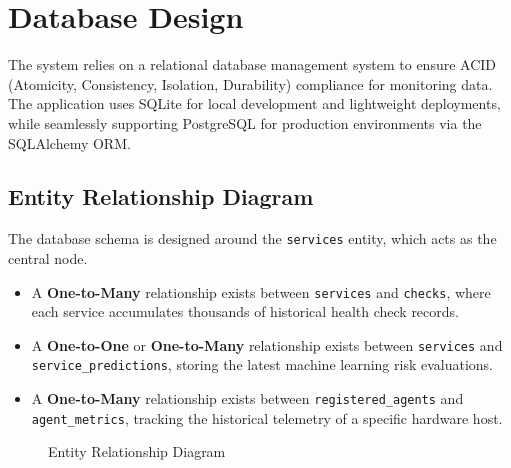 \documentclass[12pt,a4paper,oneside]{report}
\begin{document}
\section{Database Design}
\noindent The system relies on a relational database management system to ensure ACID (Atomicity, Consistency, Isolation, Durability) compliance for monitoring data. The application uses SQLite for local development and lightweight deployments, while seamlessly supporting PostgreSQL for production environments via the SQLAlchemy ORM.

\subsection{Entity Relationship Diagram}
\noindent The database schema is designed around the \texttt{services} entity, which acts as the central node. 
\begin{itemize}[label=\textbullet, leftmargin=*]
    \item A \textbf{One-to-Many} relationship exists between \texttt{services} and \texttt{checks}, where each service accumulates thousands of historical health check records.
    \item A \textbf{One-to-One} or \textbf{One-to-Many} relationship exists between \texttt{services} and \texttt{service\_predictions}, storing the latest machine learning risk evaluations.
    \item A \textbf{One-to-Many} relationship exists between \texttt{registered\_agents} and \texttt{agent\_metrics}, tracking the historical telemetry of a specific hardware host.
\end{itemize}

\begin{figure}[H]
\centering
{}
\caption{Entity Relationship Diagram}
\label{fig:er_diagram}
\end{figure}
\end{document}
